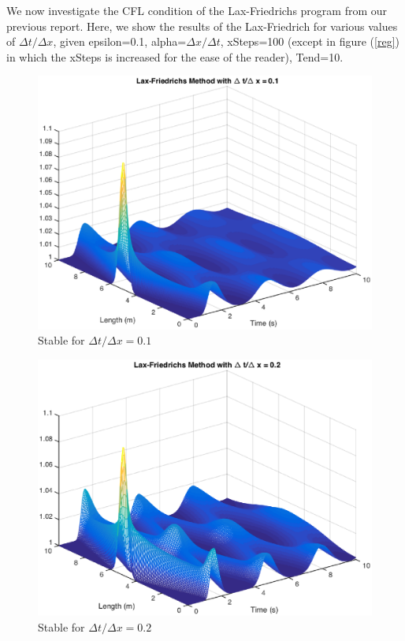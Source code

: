 We now investigate the CFL condition of the Lax-Friedrichs program from our previous report. Here, we show the results of the Lax-Friedrich for various values of $\Delta t/\Delta x$, given epsilon=0.1, alpha=$\Delta x/\Delta t$, xSteps=100 (except in figure (\ref{reg}) in which the xSteps is increased for the ease of the reader), Tend=10. 

\FloatBarrier
\begin{figure}
\begin{center}
\includegraphics[scale=0.6]{lax01.eps}
\caption{Stable for $\Delta t/\Delta x=0.1$}
\end{center}
\end{figure}

\begin{figure}
\begin{center}
\includegraphics[scale=0.6]{lax02.eps}
\caption{Stable for $\Delta t/\Delta x=0.2$}
\end{center}
\end{figure}

